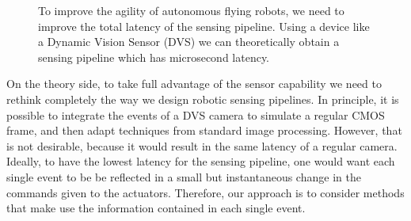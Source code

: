 \begin{figure}[H]
\begin{centering}
\par\end{centering}

\begin{centering}
\par\end{centering}

\caption{\label{fig:Discretization-and-latency}To improve the agility of autonomous
flying robots, we need to improve the total latency of the sensing
pipeline. Using a device like a Dynamic Vision Sensor (DVS) we can
theoretically obtain a sensing pipeline which has microsecond latency.}
\end{figure}


On the theory side, to take full advantage of the sensor capability
we need to rethink completely the way we design robotic sensing pipelines.
In principle, it is possible to integrate the events of a DVS camera
to simulate a regular CMOS frame, and then adapt techniques from standard
image processing. However, that is not desirable, because it would
result in the same latency of a regular camera. Ideally, to have the
lowest latency for the sensing pipeline, one would want each single
event to be be reflected in a small but instantaneous change in the
commands given to the actuators. Therefore, our approach is to consider
methods that make use the information contained in each single event.

